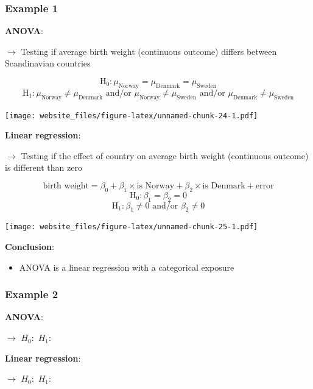 \documentclass[12pt,]{article}
\providecommand{\tightlist}{%
  \setlength{\itemsep}{0pt}\setlength{\parskip}{0pt}}
\begin{document}
\subsubsection{Example 1}\label{example-1-6}

\textbf{ANOVA}:

\(\rightarrow\) Testing if average birth weight (continuous outcome)
differs between Scandinavian countries

\[\text{H}_0: \mu_{\text{Norway}} = \mu_{\text{Denmark}} = \mu_{\text{Sweden}}\]
\[\text{H}_1: \mu_{\text{Norway}} \ne \mu_{\text{Denmark}} \text{ and/or } \mu_{\text{Norway}} \ne \mu_{\text{Sweden}}  \text{ and/or } \mu_{\text{Denmark}} \ne \mu_{\text{Sweden}}\]

\texttt{[image: website\_files/figure-latex/unnamed-chunk-24-1.pdf]}

\newpage

\textbf{Linear regression}:

\(\rightarrow\) Testing if the effect of country on average birth weight
(continuous outcome) is different than zero

\[\text{birth weight} = \beta_0 + \beta_1 \times \text{is Norway} + \beta_2 \times \text{is Denmark} + \text{error}\]
\[\text{H}_0: \beta_1 = \beta_2 = 0\]
\[\text{H}_1: \beta_1 \ne 0 \text{ and/or } \beta_2 \ne 0\]

\texttt{[image: website\_files/figure-latex/unnamed-chunk-25-1.pdf]}

\textbf{Conclusion}:

\begin{itemize}
\tightlist
\item
  ANOVA is a linear regression with a categorical exposure
\end{itemize}

\newpage

\subsubsection{Example 2}\label{example-2-6}

\textbf{ANOVA}:

\(\rightarrow\) \hfill \break
\hfill \break
\hfill \break
\(H_0:\) \hfill \break
\hfill \break
\hfill \break
\(H_1:\) \hfill \break
\hfill \break
\hfill \break

\textbf{Linear regression}:

\(\rightarrow\) \hfill \break
\hfill \break
\hfill \break
\hfill \break
\hfill \break
\hfill \break
\(H_0:\) \hfill \break
\hfill \break
\hfill \break
\(H_1:\) \hfill \break
\hfill \break
\hfill \break
\end{document}
